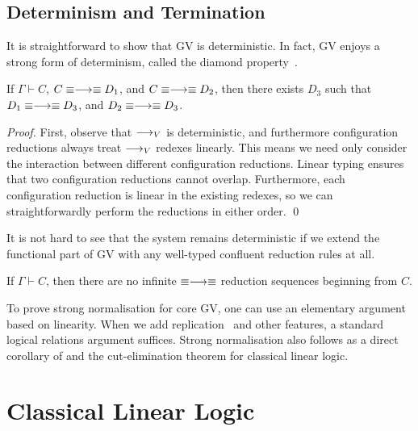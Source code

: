 \documentclass[oribibl,orivec,envcountsame]{llncs}
\begin{document}
\subsection{Determinism and Termination}\label{sec:determinism}

It is straightforward to show that GV is deterministic. In fact, GV enjoys a strong form of
determinism, called the diamond property~\cite{Barendregt84}.
\begin{theorem}
  If $\Gamma \vdash C$, $C \equiv\longrightarrow\equiv D_1$, and $C \equiv\longrightarrow\equiv D_2$, then there
  exists $D_3$ such that $D_1 \equiv\longrightarrow\equiv D_3$, and $D_2 \equiv\longrightarrow\equiv D_3$.
\end{theorem}
\begin{proof}
First, observe that $\longrightarrow_V$ is deterministic, and furthermore configuration reductions always treat
$\longrightarrow_V$ redexes linearly. This means we need only consider the interaction between different
configuration reductions.
%
Linear typing ensures that two configuration reductions cannot overlap. Furthermore, each
configuration reduction is linear in the existing redexes, so we can straightforwardly perform the
reductions in either order. \qed
\end{proof}
%
It is not hard to see that the system remains deterministic if we extend the functional part of GV
with any well-typed confluent reduction rules at all.

\begin{theorem}
  If $\Gamma \vdash C$, then there are no infinite $\equiv\longrightarrow\equiv$ reduction sequences
  beginning from $C$.
\end{theorem}
To prove strong normalisation for core GV, one can use an elementary argument based on
linearity. When we add replication~ and other features, a standard logical relations
argument suffices. Strong normalisation also follows as a direct corollary of
 and the cut-elimination theorem for classical linear logic.
 
\section{Classical Linear Logic}

\label{sec:cp}

\end{document}
